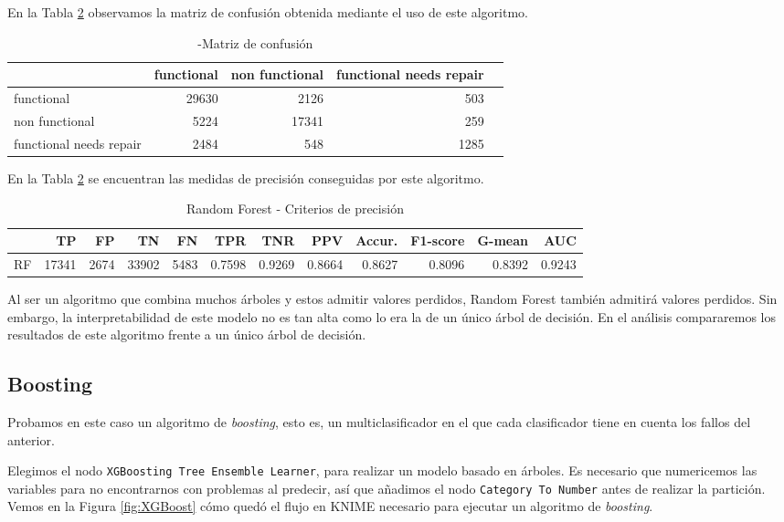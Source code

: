 \documentclass[a4paper, 20pt]{article}
\begin{document}
En la Tabla \ref{tab:RandomForest} observamos la matriz de confusión obtenida mediante el uso de este algoritmo.

\begin{table}[H]
\centering
\caption{-Matriz de confusión}
\label{tab:CMRandomForest}
\begin{tabular}{lrrrr}
\toprule
 & functional & non functional & functional needs repair\\ \midrule
functional & 29630 & 2126 & 503\\
non functional & 5224 & 17341 & 259\\
functional needs repair & 2484 & 548 & 1285\\
\bottomrule
\end{tabular}
\end{table}

En la Tabla \ref{tab:RandomForest} se encuentran las medidas de precisión conseguidas por este algoritmo.

\begin{table}[H]
\centering
\caption{Random Forest - Criterios de precisión}
\label{tab:RandomForest}
\begin{tabular}{lrrrrrrrrrrr}
\toprule
 & TP & FP & TN & FN & TPR & TNR & PPV & Accur. & F1-score & G-mean & AUC\\ \midrule
RF & 17341 & 2674 & 33902 & 5483 & 0.7598 & 0.9269 & 0.8664 & 0.8627 & 0.8096 & 0.8392 & 0.9243\\
\bottomrule
\end{tabular}
\end{table}


Al ser un algoritmo que combina muchos árboles y estos admitir valores perdidos, Random Forest también admitirá valores perdidos. Sin embargo, la interpretabilidad de este modelo no es tan alta como lo era la de un único árbol de decisión. En el análisis compararemos los resultados de este algoritmo frente a un único árbol de decisión.


\subsection{Boosting}

Probamos en este caso un algoritmo de \textit{boosting}, esto es, un multiclasificador en el que cada clasificador tiene en cuenta los fallos del anterior.

Elegimos el nodo \texttt{XGBoosting Tree Ensemble Learner}, para realizar un modelo basado en árboles. Es necesario que numericemos las variables para no encontrarnos con problemas al predecir, así que añadimos el nodo \texttt{Category To Number} antes de realizar la partición. Vemos en la Figura \ref{fig:XGBoost} cómo quedó el flujo en KNIME necesario para ejecutar un algoritmo de \textit{boosting}.
\end{document}

